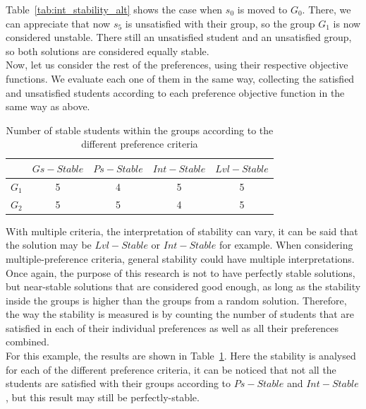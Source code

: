 Table~\ref{tab:int_stability_alt} shows the case when $s_0$ is moved to $G_0$. There, we can appreciate that now $s_5$ is unsatisfied with their group, so the group $G_1$ is now considered unstable. There still an unsatisfied student and an unsatisfied group, so both solutions are considered equally stable.\\

Now, let us consider the rest of the preferences, using their respective objective functions. We evaluate each one of them in the same way, collecting the satisfied and unsatisfied students according to each preference objective function in the same way as above.\\

\begin{table}[H]
\centering
\begin{tabular}{lcccc}
\hline
 & $Gs-Stable$ & $Ps-Stable$ & $Int-Stable$ & $Lvl-Stable$ \\
 \hline
$G_1$ & 5 & 4 & 5 & 5 \\
$G_2$ & 5 & 5 & 4 & 5 \\
\hline
\end{tabular}%
\caption{Number of stable students within the groups according to the different preference criteria}
\label{tab:preference_criteria_stability}
\end{table}

With multiple criteria, the interpretation of stability can vary, it can be said that the solution may be $Lvl-Stable$ or $Int-Stable$ for example. When considering multiple-preference criteria, general stability could have multiple interpretations. Once again, the purpose of this research is not to have perfectly stable solutions, but near-stable solutions that are considered good enough, as long as the stability inside the groups is higher than the groups from a random solution. Therefore, the way the stability is measured is by counting the number of students that are satisfied in each of their individual preferences as well as all their preferences combined.\\

For this example, the results are shown in Table~\ref{tab:preference_criteria_stability}. Here the stability is analysed for each of the different preference criteria, it can be noticed that not all the students are satisfied with their groups according to $Ps-Stable$ and $Int-Stable$, but this result may still be perfectly-stable.\\

